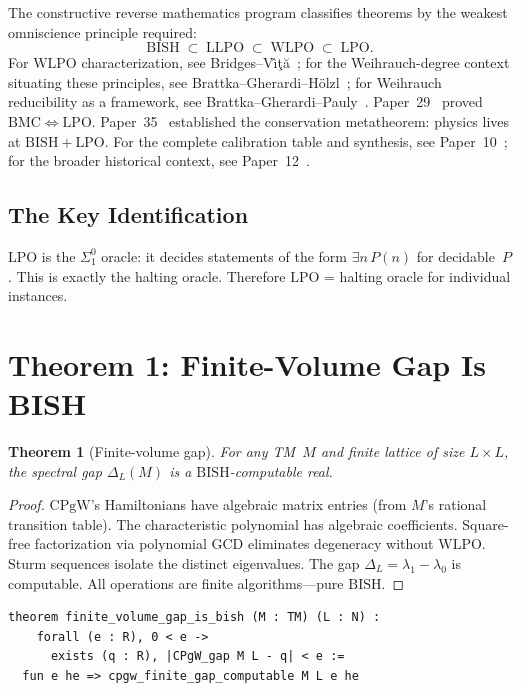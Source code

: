 \documentclass[11pt,a4paper]{article}
\theoremstyle{plain}
\newtheorem{theorem}{Theorem}[section]
\theoremstyle{definition}
\newcommand{\LPO}{\ensuremath{\mathrm{LPO}}}
\newcommand{\WLPO}{\ensuremath{\mathrm{WLPO}}}
\newcommand{\LLPO}{\ensuremath{\mathrm{LLPO}}}
\newcommand{\BMC}{\ensuremath{\mathrm{BMC}}}
\newcommand{\BISH}{\ensuremath{\mathrm{BISH}}}
\newcommand{\CPgW}{\ensuremath{\mathrm{CPgW}}}
\begin{document}
The constructive reverse mathematics program classifies theorems
by the weakest omniscience principle required:
\[
  \BISH \;\subset\; \LLPO \;\subset\; \WLPO \;\subset\; \LPO.
\]
For $\WLPO$ characterization, see Bridges--V\^{\i}\c{t}\u{a}~\cite{bridgesvita2006};
for the Weihrauch-degree context situating these principles,
see Brattka--Gherardi--H\"olzl~\cite{brattka2011};
for Weihrauch reducibility as a framework, see
Brattka--Gherardi--Pauly~\cite{brattka2021}.
Paper~29~\cite{Lee26P29} proved $\BMC \iff \LPO$.
Paper~35~\cite{Lee26P35} established the
conservation metatheorem: physics lives at $\BISH + \LPO$.
For the complete calibration table and synthesis, see
Paper~10~\cite{Lee26P10}; for the broader historical context,
see Paper~12~\cite{Lee26P12}.

\subsection{The Key Identification}

$\LPO$ is the $\Sigma^0_1$ oracle: it decides statements of the
form $\exists n\, P(n)$ for decidable~$P$. This is exactly the
halting oracle. Therefore $\LPO$ = halting oracle for individual
instances.

\section{Theorem 1: Finite-Volume Gap Is BISH}\label{sec:thm1}

\begin{theorem}[Finite-volume gap]\label{thm:finite}
For any TM~$M$ and finite lattice of size $L \times L$, the
spectral gap $\Delta_L(M)$ is a $\BISH$-computable real.
\end{theorem}

\begin{proof}
$\CPgW$'s Hamiltonians have algebraic matrix entries (from $M$'s
rational transition table). The characteristic polynomial has
algebraic coefficients. Square-free factorization via polynomial
GCD eliminates degeneracy without $\WLPO$. Sturm sequences
isolate the distinct eigenvalues. The gap $\Delta_L =
\lambda_1 - \lambda_0$ is computable. All operations are finite
algorithms---pure $\BISH$.
\end{proof}

\begin{lstlisting}[caption={Theorem 1: finite-volume gap is BISH (FiniteGap.lean)}]
theorem finite_volume_gap_is_bish (M : TM) (L : N) :
    forall (e : R), 0 < e ->
      exists (q : R), |CPgW_gap M L - q| < e :=
  fun e he => cpgw_finite_gap_computable M L e he
\end{lstlisting}
\end{document}
